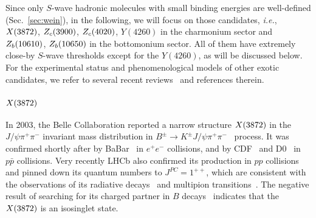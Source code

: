 Since only $S$-wave hadronic molecules with small binding energies are 
well-defined (Sec.~\ref{sec:wein}), in the following, we will focus on 
those candidates, {\sl i.e.}, $X(3872)$, $Z_c(3900)$, $Z_c(4020)$, $Y(4260)$ in the charmonium 
sector and $Z_b(10610)$, $Z_b(10650)$ in the bottomonium sector. All of them have extremely
close-by $S$-wave thresholds except for the $Y(4260)$, as will be discussed 
below.  For the experimental status and phenomenological models of other exotic
candidates, we refer to several recent  
reviews~\cite{Swanson:2006st,Eichten:2007qx,Brambilla:2014jmp,
Esposito:2014rxa,Lebed:2016hpi, Richard:2016eis,Chen:2016qju,Esposito:2016noz}
and references therein.

\subsubsection{$X(3872)$}


In 2003, the Belle Collaboration reported a narrow structure $X(3872)$ in the 
$J/\psi\pi^+\pi^-$ invariant mass distribution in $B^\pm\to K^\pm  
J/\psi\pi^+\pi^-$~\cite{Choi:2003ue} process. It was confirmed shortly after by 
BaBar~\cite{Aubert:2004ns,Aubert:2008gu} in $e^+e^-$ collisions, and by 
CDF~\cite{Acosta:2003zx,Abulencia:2005zc,Abulencia:2006ma,Aaltonen:2009vj} and 
D0~\cite{Abazov:2004kp} in $p\bar{p}$  collisions. Very recently 
LHCb also confirmed its production in $pp$  
collisions~\cite{Aaij:2011sn,Aaij:2013zoa,Aaij:2014ala,Aaij:2015eva} and pinned 
down its quantum numbers to $J^{PC}=1^{++}$, 
which are consistent with the observations of its radiative 
decays~\cite{Abe:2005ix,Aubert:2006aj,Bhardwaj:2011dj} and 
multipion transitions~\cite{Abulencia:2005zc,Abe:2005ix,delAmoSanchez:2010jr}.
The negative result of searching for its
charged partner in $B$ decays~\cite{Aubert:2004zr} indicates that the $X(3872)$ is an 
isosinglet state. 


